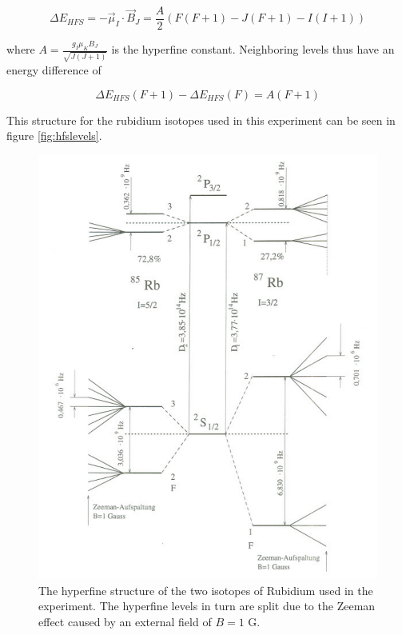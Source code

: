 \begin{equation}
\Delta E_{HFS}=-\vec{\mu}_I\cdot\vec{B}_J=\frac{A}{2}(F(F+1)-J(F+1)-I(I+1))
\end{equation}

where $A=\frac{g_I\mu_KB_J}{\sqrt{J(J+1)}}$ is the hyperfine constant. Neighboring levels thus have an energy difference of

\begin{equation}
\Delta E_{HFS}(F+1)-\Delta E_{HFS}(F)=A(F+1)
\label{eq:hfslevels}
\end{equation}

This structure for the rubidium isotopes used in this experiment can be seen in figure \ref{fig:hfslevels}.\\

\begin{figure}[H]
\centering
\includegraphics[width=1.0\linewidth]{graphics/hyperfinestructure}
\caption[Hyperfine structure of Rubidium]{The hyperfine structure of the two isotopes of Rubidium used in the experiment. The hyperfine levels in turn are split due to the Zeeman effect caused by an external field of $B=1$ G. \cite{staatsex}}
\label{fig:hyperfinestructure}
\end{figure}

